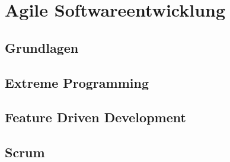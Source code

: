 \newpage
\section{Agile Softwareentwicklung}
\subsection{Grundlagen}
\subsection{Extreme Programming}
\subsection{Feature Driven Development}
\subsection{Scrum}
